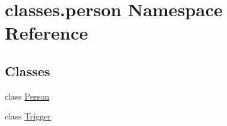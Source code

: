 \hypertarget{namespaceclasses_1_1person}{}\section{classes.\+person Namespace Reference}
\label{namespaceclasses_1_1person}
\subsection*{Classes}
\begin{DoxyCompactItemize}
\item 
class \hyperlink{classclasses_1_1person_1_1Person}{Person}
\item 
class \hyperlink{classclasses_1_1person_1_1Trigger}{Trigger}
\end{DoxyCompactItemize}
